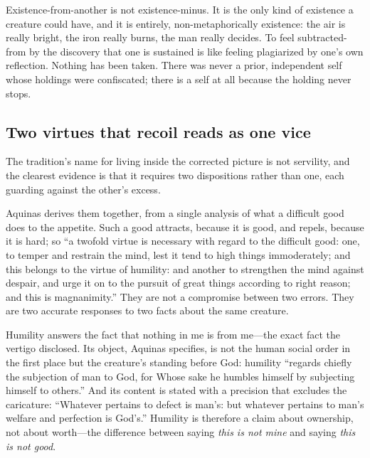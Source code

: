Existence-from-another is not existence-minus. It is the only kind of existence a creature could have, and it is entirely, non-metaphorically existence: the air is really bright, the iron really burns, the man really decides. To feel subtracted-from by the discovery that one is sustained is like feeling plagiarized by one's own reflection. Nothing has been taken. There was never a prior, independent self whose holdings were confiscated; there is a self at all because the holding never stops.

\subsection{Two virtues that recoil reads as one vice}

The tradition's name for living inside the corrected picture is not servility, and the clearest evidence is that it requires two dispositions rather than one, each guarding against the other's excess.

Aquinas derives them together, from a single analysis of what a difficult good does to the appetite. Such a good attracts, because it is good, and repels, because it is hard; so ``a twofold virtue is necessary with regard to the difficult good: one, to temper and restrain the mind, lest it tend to high things immoderately; and this belongs to the virtue of humility: and another to strengthen the mind against despair, and urge it on to the pursuit of great things according to right reason; and this is magnanimity.'' They are not a compromise between two errors. They are two accurate responses to two facts about the same creature.

Humility answers the fact that nothing in me is from me---the exact fact the vertigo disclosed. Its object, Aquinas specifies, is not the human social order in the first place but the creature's standing before God: humility ``regards chiefly the subjection of man to God, for Whose sake he humbles himself by subjecting himself to others.'' And its content is stated with a precision that excludes the caricature: ``Whatever pertains to defect is man's: but whatever pertains to man's welfare and perfection is God's.'' Humility is therefore a claim about ownership, not about worth---the difference between saying \emph{this is not mine} and saying \emph{this is not good}.

